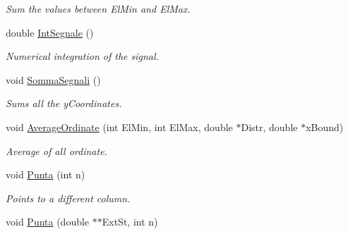 \begin{DoxyCompactItemize}
\begin{DoxyCompactList}\small\item\em \-Sum the values between \-El\-Min and \-El\-Max. \end{DoxyCompactList}\item 
\hypertarget{classVarDatFile_a43b771dc3214a9a36b2aa2a91ffb8edb}{double \hyperlink{classVarDatFile_a43b771dc3214a9a36b2aa2a91ffb8edb}{\-Int\-Segnale} ()}\label{classVarDatFile_a43b771dc3214a9a36b2aa2a91ffb8edb}

\begin{DoxyCompactList}\small\item\em \-Numerical integration of the signal. \end{DoxyCompactList}\item 
\hypertarget{classVarDatFile_a7a3685f3878bcb9e05a16bdadface9f9}{void \hyperlink{classVarDatFile_a7a3685f3878bcb9e05a16bdadface9f9}{\-Somma\-Segnali} ()}\label{classVarDatFile_a7a3685f3878bcb9e05a16bdadface9f9}

\begin{DoxyCompactList}\small\item\em \-Sums all the y\-Coordinates. \end{DoxyCompactList}\item 
\hypertarget{classVarDatFile_a982e54013ecdf9dcadead5247def28be}{void \hyperlink{classVarDatFile_a982e54013ecdf9dcadead5247def28be}{\-Average\-Ordinate} (int \-El\-Min, int \-El\-Max, double $\ast$\-Distr, double $\ast$x\-Bound)}\label{classVarDatFile_a982e54013ecdf9dcadead5247def28be}

\begin{DoxyCompactList}\small\item\em \-Average of all ordinate. \end{DoxyCompactList}\item 
\hypertarget{classVarDatFile_a9bb9fb6bb48e6c597ba31a271e1be613}{void \hyperlink{classVarDatFile_a9bb9fb6bb48e6c597ba31a271e1be613}{\-Punta} (int n)}\label{classVarDatFile_a9bb9fb6bb48e6c597ba31a271e1be613}

\begin{DoxyCompactList}\small\item\em \-Points to a different column. \end{DoxyCompactList}\item 
\hypertarget{classVarDatFile_ad2642e22b919be30857ed370e8d22acc}{void \hyperlink{classVarDatFile_ad2642e22b919be30857ed370e8d22acc}{\-Punta} (double $\ast$$\ast$\-Ext\-St, int n)}\label{classVarDatFile_ad2642e22b919be30857ed370e8d22acc}


\end{DoxyCompactItemize}
